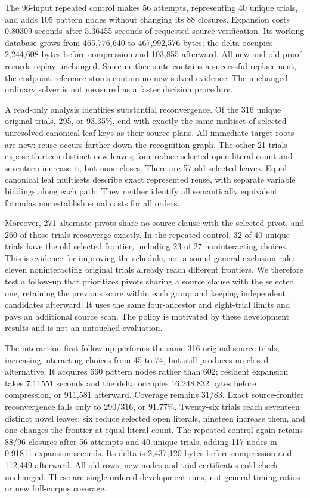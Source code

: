\documentclass[11pt,a4paper]{article}
\numberwithin{equation}{section}
\theoremstyle{plain}
\theoremstyle{definition}
\theoremstyle{remark}
\begin{document}
The 96-input repeated control makes 56 attempts, representing 40 unique trials, and adds 105 pattern nodes without changing its 88 closures. Expansion costs 0.80309 seconds after 5.36455 seconds of requested-source verification. Its working database grows from 465,776,640 to 467,992,576 bytes; the delta occupies 2,244,608 bytes before compression and 103,855 afterward. All new and old proof records replay unchanged. Since neither suite contains a successful replacement, the endpoint-reference stores contain no new solved evidence. The unchanged ordinary solver is not measured as a faster decision procedure.

A read-only analysis identifies substantial reconvergence. Of the 316 unique original trials, 295, or 93.35\%, end with exactly the same multiset of selected unresolved canonical leaf keys as their source plans. All immediate target roots are new: reuse occurs farther down the recognition graph. The other 21 trials expose thirteen distinct new leaves; four reduce selected open literal count and seventeen increase it, but none closes. There are 57 old selected leaves. Equal canonical leaf multisets describe exact represented reuse, with separate variable bindings along each path. They neither identify all semantically equivalent formulas nor establish equal costs for all orders.

Moreover, 271 alternate pivots share no source clause with the selected pivot, and 260 of those trials reconverge exactly. In the repeated control, 32 of 40 unique trials have the old selected frontier, including 23 of 27 noninteracting choices. This is evidence for improving the schedule, not a sound general exclusion rule: eleven noninteracting original trials already reach different frontiers. We therefore test a follow-up that prioritizes pivots sharing a source clause with the selected one, retaining the previous score within each group and keeping independent candidates afterward. It uses the same four-ancestor and eight-trial limits and pays an additional source scan. The policy is motivated by these development results and is not an untouched evaluation.

The interaction-first follow-up performs the same 316 original-source trials, increasing interacting choices from 45 to 74, but still produces no closed alternative. It acquires 660 pattern nodes rather than 602; resident expansion takes 7.11551 seconds and the delta occupies 16,248,832 bytes before compression, or 911,581 afterward. Coverage remains 31/83. Exact source-frontier reconvergence falls only to 290/316, or 91.77\%. Twenty-six trials reach seventeen distinct novel leaves; six reduce selected open literals, nineteen increase them, and one changes the frontier at equal literal count. The repeated control again retains 88/96 closures after 56 attempts and 40 unique trials, adding 117 nodes in 0.91811 expansion seconds. Its delta is 2,437,120 bytes before compression and 112,449 afterward. All old rows, new nodes and trial certificates cold-check unchanged. These are single ordered development runs, not general timing ratios or new full-corpus coverage.
\end{document}
